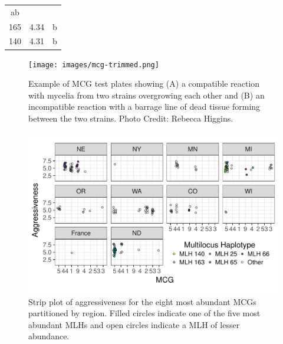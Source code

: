 \documentclass[fleqn,10pt,lineno]{wlpeerj} %
\theoremstyle{definition}
\theoremstyle{definition}
\theoremstyle{definition}
\theoremstyle{remark}
\begin{document}
\begin{longtable}[]{@{}cll@{}}
\begin{minipage}[t]{0.08\columnwidth}
ab\strut
\end{minipage}\tabularnewline
\begin{minipage}[t]{0.10\columnwidth}\centering\strut
165\strut
\end{minipage} & \begin{minipage}[t]{0.25\columnwidth}\raggedright\strut
4.34\strut
\end{minipage} & \begin{minipage}[t]{0.08\columnwidth}\raggedright\strut
b\strut
\end{minipage}\tabularnewline
\begin{minipage}[t]{0.10\columnwidth}\centering\strut
140\strut
\end{minipage} & \begin{minipage}[t]{0.25\columnwidth}\raggedright\strut
4.31\strut
\end{minipage} & \begin{minipage}[t]{0.08\columnwidth}\raggedright\strut
b\strut
\end{minipage}\tabularnewline
\bottomrule
\end{longtable}

\begin{figure}
\centering
\texttt{[image: images/mcg-trimmed.png]}
\caption{Example of MCG test plates showing (A) a compatible reaction
with mycelia from two strains overgrowing each other and (B) an
incompatible reaction with a barrage line of dead tissue forming between
the two strains. Photo Credit: Rebecca Higgins.}\label{mcg-fig}
\end{figure}

\begin{figure}
\centering
\includegraphics[width=1.00000\textwidth]{../../results/figures/publication/RMM-aggressiveness.pdf}
\caption{Strip plot of aggressiveness for the eight most abundant MCGs
partitioned by region. Filled circles indicate one of the five most
abundant MLHs and open circles indicate a MLH of lesser
abundance.}\label{mcg-mlh-region-aggressiveness}
\end{figure}
\end{document}
